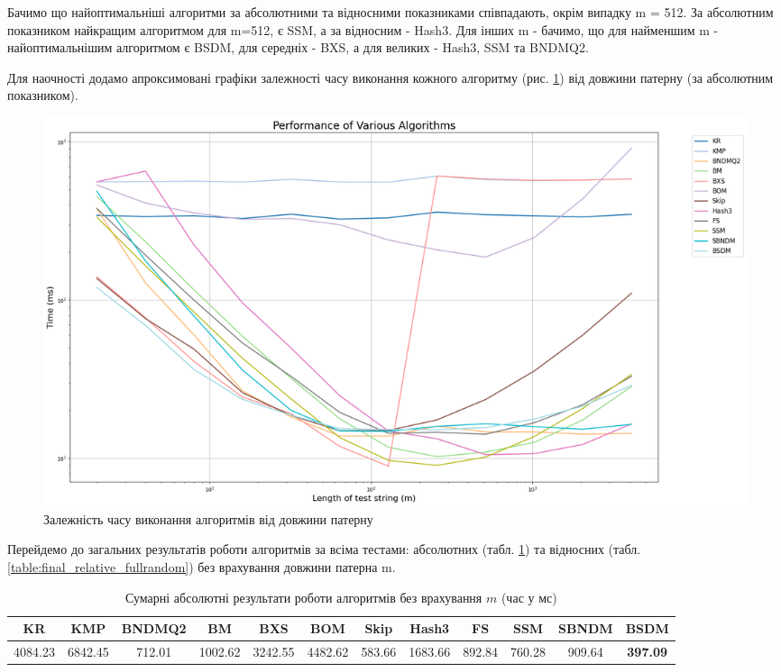 \documentclass[a4paper,14pt]{extarticle} %
\begin{document}
					Бачимо що найоптимальніші алгоритми за абсолютними та відносними показниками співпадають, окрім випадку m = 512.
					За абсолютним показником найкращим алгоритмом для m=512, є SSM, а за відносним - Hash3.
					Для інших m - бачимо, що для найменшим m - найоптимальнішим алгоритмом є BSDM, для середніх - BXS, а для великих - Hash3, SSM та BNDMQ2.

					Для наочності додамо апроксимовані графіки залежності часу виконання кожного алгоритму (рис. \ref{fig:full_random_graph}) від довжини патерну (за абсолютним показником).

					\begin{figure}[H]
						\centering
						\includegraphics[width=1\textwidth]{images/full_random_graph.png}
						\caption{Залежність часу виконання алгоритмів від довжини патерну}
						\label{fig:full_random_graph}
					\end{figure}

					Перейдемо до загальних результатів роботи алгоритмів за всіма тестами: абсолютних (табл. \ref{table:final_absolute_fullrandom}) та відносних (табл. \ref{table:final_relative_fullrandom}) без врахування довжини патерна m.

					\begin{table}[H]
						\centering
						\scriptsize
						\begin{tabular}{|c|c|c|c|c|c|c|c|c|c|c|c|}
						\hline
						\textbf{KR} & \textbf{KMP} & \textbf{BNDMQ2} & \textbf{BM} & \textbf{BXS} & \textbf{BOM} & \textbf{Skip} & \textbf{Hash3} & \textbf{FS} & \textbf{SSM} & \textbf{SBNDM} & \textbf{BSDM} \\
						\hline
						4084.23 & 6842.45 & 712.01 & 1002.62 & 3242.55 & 4482.62 & 583.66 & 1683.66 & 892.84 & 760.28 & 909.64 & \textbf{397.09} \\
						\hline
						\end{tabular}
						\caption{Сумарні абсолютні результати роботи алгоритмів без врахування $m$ (час у мс)}
						\label{table:final_absolute_fullrandom}
					\end{table}
					
\end{document}
